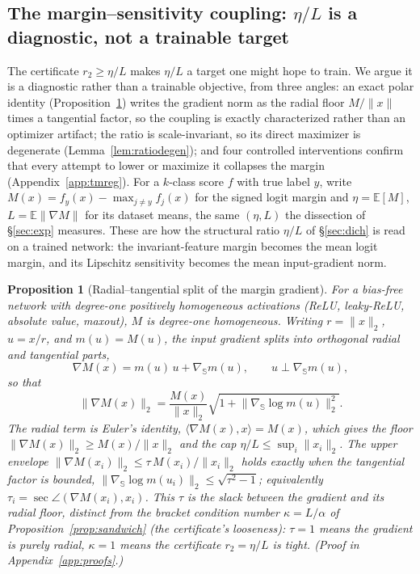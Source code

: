 \documentclass{article}
\newtheorem{proposition}{Proposition}
\theoremstyle{definition}
\begin{document}
\subsection{The margin--sensitivity coupling: \texorpdfstring{$\eta/L$}{eta/L} is a diagnostic, not a trainable target}\label{sec:coupling}
The certificate $r_2\ge\eta/L$ makes $\eta/L$ a target one might hope to train. We argue it is a diagnostic rather than a trainable objective, from three angles: an exact polar identity (Proposition~\ref{prop:split}) writes the gradient norm as the radial floor $M/\|x\|$ times a tangential factor, so the coupling is exactly characterized rather than an optimizer artifact; the ratio is scale-invariant, so its direct maximizer is degenerate (Lemma~\ref{lem:ratiodegen}); and four controlled interventions confirm that every attempt to lower or maximize it collapses the margin (Appendix~\ref{app:tmreg}). For a $k$-class score $f$ with true label $y$, write $M(x)=f_y(x)-\max_{j\neq y}f_j(x)$ for the signed logit margin and $\eta=\mathbb E[M]$, $L=\mathbb E\|\nabla M\|$ for its dataset means, the same $(\eta,L)$ the dissection of \S\ref{sec:exp} measures. These are how the structural ratio $\eta/L$ of \S\ref{sec:dich} is read on a trained network: the invariant-feature margin becomes the mean logit margin, and its Lipschitz sensitivity becomes the mean input-gradient norm.

\begin{proposition}[Radial--tangential split of the margin gradient]\label{prop:split}
For a bias-free network with degree-one positively homogeneous activations (ReLU, leaky-ReLU, absolute value, maxout), $M$ is degree-one homogeneous. Writing $r=\|x\|_2$, $u=x/r$, and $m(u)=M(u)$, the input gradient splits into orthogonal radial and tangential parts,
\[
\nabla M(x)=m(u)\,u+\nabla_{\mathbb S}m(u),\qquad u\perp\nabla_{\mathbb S}m(u),
\]
so that
\[
\|\nabla M(x)\|_2=\frac{M(x)}{\|x\|_2}\sqrt{1+\bigl\|\nabla_{\mathbb S}\log m(u)\bigr\|_2^2}.
\]
The radial term is Euler's identity, $\langle\nabla M(x),x\rangle=M(x)$, which gives the floor $\|\nabla M(x)\|_2\ge M(x)/\|x\|_2$ and the cap $\eta/L\le\sup_i\|x_i\|_2$. The upper envelope $\|\nabla M(x_i)\|_2\le\tau\,M(x_i)/\|x_i\|_2$ holds exactly when the tangential factor is bounded, $\|\nabla_{\mathbb S}\log m(u_i)\|_2\le\sqrt{\tau^2-1}$; equivalently $\tau_i=\sec\angle(\nabla M(x_i),x_i)$. This $\tau$ is the slack between the gradient and its radial floor, distinct from the bracket condition number $\kappa=L/\alpha$ of Proposition~\ref{prop:sandwich} (the certificate's looseness): $\tau=1$ means the gradient is purely radial, $\kappa=1$ means the certificate $r_2=\eta/L$ is tight. (Proof in Appendix~\ref{app:proofs}.)
\end{proposition}
\end{document}
